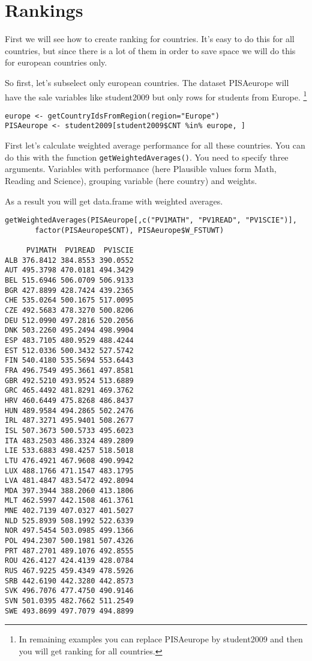 \section{Rankings}

First we will see how to create ranking for countries.
It's easy to do this for all countries, but since there is a lot of them in order to save space we will do this for european countries only.

So first, let's subselect only european countries. The dataset PISAeurope will have the sale variables like student2009 but only rows for students from Europe. \footnote{In remaining examples you can replace PISAeurope by student2009 and then you will get ranking for all countries.}
\begin{shaded}\begin{verbatim}
europe <- getCountryIdsFromRegion(region="Europe")
PISAeurope <- student2009[student2009$CNT %in% europe, ]
\end{verbatim}\end{shaded}

First let's calculate weighted average performance for all these countries. You can do this with the function \verb:getWeightedAverages():. You need to specify three arguments. Variables with performance (here Plausible values form Math, Reading and Science), grouping variable (here country) and weights.

As a result you will get data.frame with weighted averages.

\begin{shaded}\begin{verbatim}
getWeightedAverages(PISAeurope[,c("PV1MATH", "PV1READ", "PV1SCIE")], 
       factor(PISAeurope$CNT), PISAeurope$W_FSTUWT)
       
     PV1MATH  PV1READ  PV1SCIE
ALB 376.8412 384.8553 390.0552
AUT 495.3798 470.0181 494.3429
BEL 515.6946 506.0709 506.9133
BGR 427.8899 428.7424 439.2365
CHE 535.0264 500.1675 517.0095
CZE 492.5683 478.3270 500.8206
DEU 512.0990 497.2816 520.2056
DNK 503.2260 495.2494 498.9904
ESP 483.7105 480.9529 488.4244
EST 512.0336 500.3432 527.5742
FIN 540.4180 535.5694 553.6443
FRA 496.7549 495.3661 497.8581
GBR 492.5210 493.9524 513.6889
GRC 465.4492 481.8291 469.3762
HRV 460.6449 475.8268 486.8437
HUN 489.9584 494.2865 502.2476
IRL 487.3271 495.9401 508.2677
ISL 507.3673 500.5733 495.6023
ITA 483.2503 486.3324 489.2809
LIE 533.6883 498.4257 518.5018
LTU 476.4921 467.9608 490.9942
LUX 488.1766 471.1547 483.1795
LVA 481.4847 483.5472 492.8094
MDA 397.3944 388.2060 413.1806
MLT 462.5997 442.1508 461.3761
MNE 402.7139 407.0327 401.5027
NLD 525.8939 508.1992 522.6339
NOR 497.5454 503.0985 499.1366
POL 494.2307 500.1981 507.4326
PRT 487.2701 489.1076 492.8555
ROU 426.4127 424.4139 428.0784
RUS 467.9225 459.4349 478.5926
SRB 442.6190 442.3280 442.8573
SVK 496.7076 477.4750 490.9146
SVN 501.0395 482.7662 511.2549
SWE 493.8699 497.7079 494.8899
\end{verbatim}\end{shaded}

